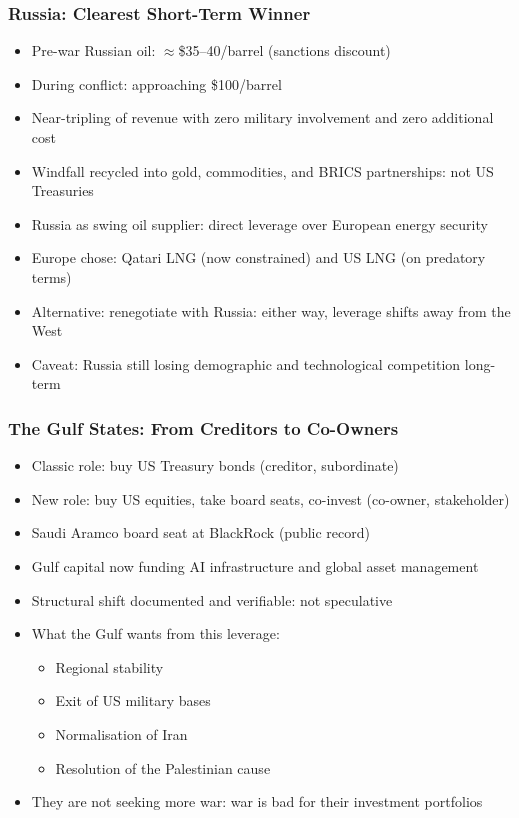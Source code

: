 \begin{frame}[fragile]\frametitle{Russia: Clearest Short-Term Winner}
  \begin{itemize}
    \item Pre-war Russian oil: $\approx$\$35--40/barrel (sanctions discount)
    \item During conflict: approaching \$100/barrel
    \item Near-tripling of revenue with zero military involvement and zero additional cost
    \item Windfall recycled into gold, commodities, and BRICS partnerships: not US Treasuries
    \item Russia as swing oil supplier: direct leverage over European energy security
    \item Europe chose: Qatari LNG (now constrained) and US LNG (on predatory terms)
    \item Alternative: renegotiate with Russia: either way, leverage shifts away from the West
    \item Caveat: Russia still losing demographic and technological competition long-term
  \end{itemize}
\end{frame}

\begin{frame}[fragile]\frametitle{The Gulf States: From Creditors to Co-Owners}
  \begin{itemize}
    \item Classic role: buy US Treasury bonds (creditor, subordinate)
    \item New role: buy US equities, take board seats, co-invest (co-owner, stakeholder)
    \item Saudi Aramco board seat at BlackRock (public record)
    \item Gulf capital now funding AI infrastructure and global asset management
    \item Structural shift documented and verifiable: not speculative
    \item What the Gulf wants from this leverage:
      \begin{itemize}
        \item Regional stability
        \item Exit of US military bases
        \item Normalisation of Iran
        \item Resolution of the Palestinian cause
      \end{itemize}
    \item They are not seeking more war: war is bad for their investment portfolios
  \end{itemize}
\end{frame}

